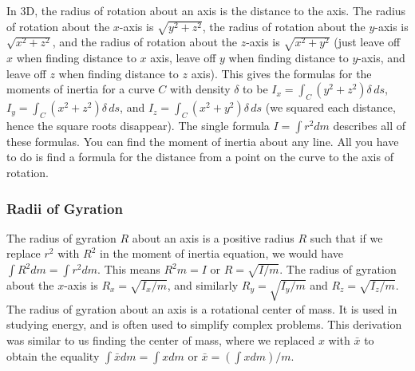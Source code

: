In 3D, the radius of rotation about an axis is the distance to the
axis.  The radius of rotation about the $x$-axis is $\sqrt{y^2+z^2}$,
the radius of rotation about the $y$-axis is $\sqrt{x^2+z^2}$, and the
radius of rotation about the $z$-axis is $\sqrt{x^2+y^2}$ (just leave
off $x$ when finding distance to $x$ axis, leave off $y$ when finding
distance to $y$-axis, and leave off $z$ when finding distance to $z$
axis). This gives the formulas for the moments of inertia for a curve
$C$ with density $\delta$ to be $I_x = \int_C (y^2+z^2)\delta \,ds$, $I_y = \int_C
(x^2+z^2)\delta \,ds$, and $I_z = \int_C (x^2+y^2)\delta \,ds$ (we squared each
distance, hence the square roots disappear).  The single formula $I=\int
r^2 dm$ describes all of these formulas. You can find the moment of
inertia about any line. All you have to do is find a formula for the
distance from a point on the curve to the axis of rotation.

\subsubsection{Radii of Gyration}

The radius of gyration $R$ about an axis is a positive radius $R$ such
that if we replace $r^2$ with $R^2$ in the moment of inertia equation,
we would have $\int R^2 dm = \int r^2 dm$. This means $R^2 m = I$ or
$R=\sqrt{I/m}$. The radius of gyration about the $x$-axis is $R_x =
\sqrt{I_x/m}$, and similarly $R_y = \sqrt{I_y/m}$ and $R_z=
\sqrt{I_z/m}$. The radius of gyration about an axis is a rotational
center of mass. It is used in studying energy, and is often used to
simplify complex problems. This derivation was similar to us finding
the center of mass, where we replaced $x$ with $\bar x$ to obtain the
equality $\int \bar x dm = \int x dm$ or $\bar x =(\int x dm)/m$.

